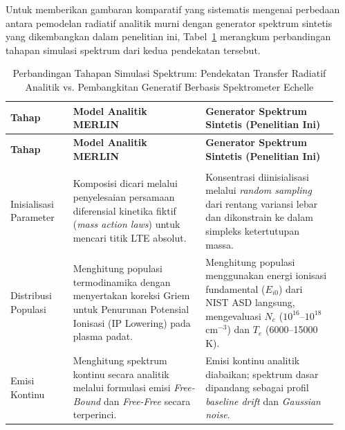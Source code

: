 Untuk memberikan gambaran komparatif yang sistematis mengenai perbedaan antara pemodelan radiatif analitik murni dengan generator spektrum sintetis yang dikembangkan dalam penelitian ini, Tabel~\ref{tab:simulasi_perbandingan} merangkum perbandingan tahapan simulasi spektrum dari kedua pendekatan tersebut.

{\small
\renewcommand{\arraystretch}{1.3} %
\begin{longtable}{|>{\raggedright\arraybackslash}p{0.18\linewidth}|>{\raggedright\arraybackslash}p{0.38\linewidth}|>{\raggedright\arraybackslash}p{0.38\linewidth}|}
\caption{Perbandingan Tahapan Simulasi Spektrum: Pendekatan Transfer Radiatif Analitik vs. Pembangkitan Generatif Berbasis Spektrometer Echelle}
\label{tab:simulasi_perbandingan} \\
\hline
\rowcolor{gray!20}
\textbf{Tahap} & \textbf{Model Analitik MERLIN \citep{favre_merlin_2025}} & \textbf{Generator Spektrum Sintetis (Penelitian Ini)} \\
\hline
\endfirsthead
\hline
\rowcolor{gray!20}
\textbf{Tahap} & \textbf{Model Analitik MERLIN \citep{favre_merlin_2025}} & \textbf{Generator Spektrum Sintetis (Penelitian Ini)} \\
\hline
\endhead
\hline
\multicolumn{3}{r}{{Bersambung ke halaman berikutnya}} \\
\endfoot
\hline
\endlastfoot

Inisialisasi Parameter & 
Komposisi dicari melalui penyelesaian persamaan diferensial kinetika fiktif (\textit{mass action laws}) untuk mencari titik LTE absolut. & 
Konsentrasi diinisialisasi melalui \textit{random sampling} dari rentang variansi lebar dan dikonstrain ke dalam simpleks ketertutupan massa. \\
\hline

Distribusi Populasi & 
Menghitung populasi termodinamika dengan menyertakan koreksi Griem untuk Penurunan Potensial Ionisasi (IP Lowering) pada plasma padat. & 
Menghitung populasi menggunakan energi ionisasi fundamental ($E_{i0}$) dari NIST ASD langsung, mengevaluasi $N_e$ ($10^{16}$--$10^{18}$ cm$^{-3}$) dan $T_e$ (6000--15000 K). \\
\hline

Emisi Kontinu & 
Menghitung spektrum kontinu secara analitik melalui formulasi emisi \textit{Free-Bound} dan \textit{Free-Free} secara terperinci. & 
Emisi kontinu analitik diabaikan; spektrum dasar dipandang sebagai profil \textit{baseline drift} dan \textit{Gaussian noise}. \\
\hline


\end{longtable}}
